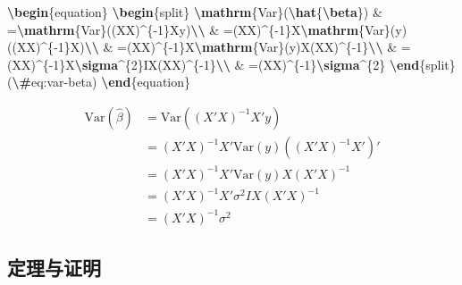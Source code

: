 \documentclass[
  12pt,
]{krantz}
\newenvironment{Shaded}{\begin{snugshade}}{\end{snugshade}}
\newcommand{\ExtensionTok}[1]{#1}
\newcommand{\KeywordTok}[1]{\textcolor[rgb]{0.13,0.29,0.53}{\textbf{#1}}}
\newcommand{\NormalTok}[1]{#1}
\newcommand{\SpecialCharTok}[1]{\textcolor[rgb]{0.81,0.36,0.00}{\textbf{#1}}}
\newcommand{\SpecialStringTok}[1]{\textcolor[rgb]{0.31,0.60,0.02}{#1}}
\theoremstyle{definition}
\theoremstyle{definition}
\theoremstyle{definition}
\theoremstyle{definition}
\theoremstyle{remark}
\begin{document}
\begin{Shaded}
\begin{Highlighting}[]
\KeywordTok{\textbackslash{}begin}\NormalTok{\{}\ExtensionTok{equation}\NormalTok{\}}\SpecialStringTok{ }
\KeywordTok{\textbackslash{}begin}\NormalTok{\{}\ExtensionTok{split}\NormalTok{\}}
\SpecialCharTok{\textbackslash{}mathrm}\SpecialStringTok{\{Var\}(}\SpecialCharTok{\textbackslash{}hat}\SpecialStringTok{\{}\SpecialCharTok{\textbackslash{}beta}\SpecialStringTok{\}) \& =}\SpecialCharTok{\textbackslash{}mathrm}\SpecialStringTok{\{Var\}((X\textquotesingle{}X)\^{}\{{-}1\}X\textquotesingle{}y)}\SpecialCharTok{\textbackslash{}\textbackslash{}}
\SpecialStringTok{ \& =(X\textquotesingle{}X)\^{}\{{-}1\}X\textquotesingle{}}\SpecialCharTok{\textbackslash{}mathrm}\SpecialStringTok{\{Var\}(y)((X\textquotesingle{}X)\^{}\{{-}1\}X\textquotesingle{})\textquotesingle{}}\SpecialCharTok{\textbackslash{}\textbackslash{}}
\SpecialStringTok{ \& =(X\textquotesingle{}X)\^{}\{{-}1\}X\textquotesingle{}}\SpecialCharTok{\textbackslash{}mathrm}\SpecialStringTok{\{Var\}(y)X(X\textquotesingle{}X)\^{}\{{-}1\}}\SpecialCharTok{\textbackslash{}\textbackslash{}}
\SpecialStringTok{ \& =(X\textquotesingle{}X)\^{}\{{-}1\}X\textquotesingle{}}\SpecialCharTok{\textbackslash{}sigma}\SpecialStringTok{\^{}\{2\}IX(X\textquotesingle{}X)\^{}\{{-}1\}}\SpecialCharTok{\textbackslash{}\textbackslash{}}
\SpecialStringTok{ \& =(X\textquotesingle{}X)\^{}\{{-}1\}}\SpecialCharTok{\textbackslash{}sigma}\SpecialStringTok{\^{}\{2\}}
\KeywordTok{\textbackslash{}end}\NormalTok{\{}\ExtensionTok{split}\NormalTok{\}}
\SpecialStringTok{(}\SpecialCharTok{\textbackslash{}\#}\SpecialStringTok{eq:var{-}beta)}
\KeywordTok{\textbackslash{}end}\NormalTok{\{}\ExtensionTok{equation}\NormalTok{\} }
\end{Highlighting}
\end{Shaded}

\begin{equation}
\begin{split}
\mathrm{Var}(\hat{\beta}) & =\mathrm{Var}((X'X)^{-1}X'y)\\
 & =(X'X)^{-1}X'\mathrm{Var}(y)((X'X)^{-1}X')'\\
 & =(X'X)^{-1}X'\mathrm{Var}(y)X(X'X)^{-1}\\
 & =(X'X)^{-1}X'\sigma^{2}IX(X'X)^{-1}\\
 & =(X'X)^{-1}\sigma^{2}
\end{split}
\label{eq:var-beta}
\end{equation}

\hypertarget{theorems}{%
\subsection{定理与证明}\label{theorems}}
\end{document}
